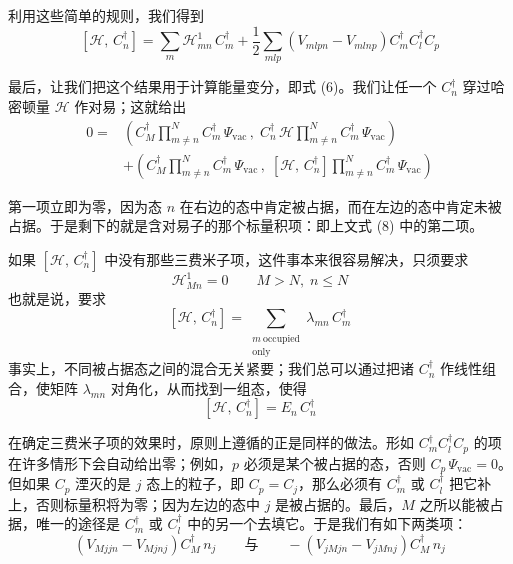 利用这些简单的规则，我们得到
\begin{equation*}
\left[\mathcal{H},\, C_n^{\dagger}\right] = \sum_m \mathcal{H}^1_{mn}\, C_m^{\dagger} + \frac{1}{2}\sum_{mlp}\left(V_{mlpn} - V_{mlnp}\right) C_m^{\dagger} C_l^{\dagger} C_p
\tag{7}
\end{equation*}

最后，让我们把这个结果用于计算能量变分，即式 (6)。我们让任一个 $C_n^{\dagger}$ 穿过哈密顿量 $\mathcal{H}$ 作对易；这就给出
\begin{align*}
0 = {}& \left(C_M^{\dagger} \prod_{m\neq n}^{N} C_m^{\dagger}\,\Psi_{\mathrm{vac}}\,,\; C_n^{\dagger}\,\mathcal{H} \prod_{m\neq n}^{N} C_m^{\dagger}\,\Psi_{\mathrm{vac}}\right)\\
&+ \left(C_M^{\dagger} \prod_{m\neq n}^{N} C_m^{\dagger}\,\Psi_{\mathrm{vac}}\,,\; \left[\mathcal{H},\, C_n^{\dagger}\right] \prod_{m\neq n}^{N} C_m^{\dagger}\,\Psi_{\mathrm{vac}}\right)
\tag{8}
\end{align*}

第一项立即为零，因为态 $n$ 在右边的态中肯定被占据，而在左边的态中肯定未被占据。于是剩下的就是含对易子的那个标量积项：即上文式 (8) 中的第二项。

如果 $\left[\mathcal{H},\, C_n^{\dagger}\right]$ 中没有那些三费米子项，这件事本来很容易解决，只须要求
\begin{equation*}
\mathcal{H}^1_{Mn} = 0\qquad M > N,\; n \leq N
\end{equation*}
也就是说，要求
\begin{equation*}
\left[\mathcal{H},\, C_n^{\dagger}\right] = \sum_{\substack{m\ \text{occupied}\\ \text{only}}} \lambda_{mn}\, C_m^{\dagger}
\end{equation*}
事实上，不同被占据态之间的混合无关紧要；我们总可以通过把诸 $C_n^{\dagger}$ 作线性组合，使矩阵 $\lambda_{mn}$ 对角化，从而找到一组态，使得
\begin{equation*}
\left[\mathcal{H},\, C_n^{\dagger}\right] = E_n\, C_n^{\dagger}
\end{equation*}

在确定三费米子项的效果时，原则上遵循的正是同样的做法。形如 $C_m^{\dagger} C_l^{\dagger} C_p$ 的项在许多情形下会自动给出零；例如，$p$ 必须是某个被占据的态，否则 $C_p\,\Psi_{\mathrm{vac}} = 0$。但如果 $C_p$ 湮灭的是 $j$ 态上的粒子，即 $C_p = C_j$，那么必须有 $C_m^{\dagger}$ 或 $C_l^{\dagger}$ 把它补上，否则标量积将为零；因为左边的态中 $j$ 是被占据的。最后，$M$ 之所以能被占据，唯一的途径是 $C_m^{\dagger}$ 或 $C_l^{\dagger}$ 中的另一个去填它。于是我们有如下两类项：
\begin{equation*}
\left(V_{Mjjn} - V_{Mjnj}\right) C_M^{\dagger}\, n_j \qquad\text{与}\qquad -\left(V_{jMjn} - V_{jMnj}\right) C_M^{\dagger}\, n_j
\end{equation*}

